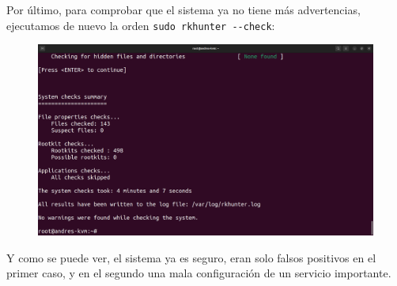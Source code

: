 \documentclass{article}
\begin{document}
Por último, para comprobar que el sistema ya no tiene más advertencias, ejecutamos de nuevo la orden \verb|sudo rkhunter --check|:

\begin{figure}[H]
    \includegraphics[width=\textwidth]{imagenes/rkhunterokk.png}
\end{figure}

Y como se puede ver, el sistema ya es seguro, eran solo falsos positivos en el primer caso, y en el segundo una mala configuración de un servicio importante.
\end{document}
